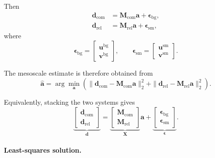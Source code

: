 \documentclass{article}
\begin{document}
Then
\begin{align}
\mathbf{d}_{\mathrm{com}}
&=
\mathbf{M}_{\mathrm{com}}\mathbf{a}
+
\boldsymbol{\epsilon}_{\mathrm{bg}},
\label{eq:com_ls_system}
\\
\mathbf{d}_{\mathrm{rel}}
&=
\mathbf{M}_{\mathrm{rel}}\mathbf{a}
+
\boldsymbol{\epsilon}_{\mathrm{sm}},
\label{eq:rel_ls_system}
\end{align}
where
\begin{equation}
\boldsymbol{\epsilon}_{\mathrm{bg}}
=
\begin{bmatrix}
\mathbf{u}^{\mathrm{bg}}\\
\mathbf{v}^{\mathrm{bg}}
\end{bmatrix},
\qquad
\boldsymbol{\epsilon}_{\mathrm{sm}}
=
\begin{bmatrix}
\mathbf{u}^{\mathrm{sm}}\\
\mathbf{v}^{\mathrm{sm}}
\end{bmatrix}.
\end{equation}

The mesoscale estimate is therefore obtained from
\begin{equation}
\hat{\mathbf a}
=
\arg\min_{\mathbf a}
\left(
\|
\mathbf{d}_{\mathrm{com}}-\mathbf{M}_{\mathrm{com}}\mathbf a
\|_2^2
+
\|
\mathbf{d}_{\mathrm{rel}}-\mathbf{M}_{\mathrm{rel}}\mathbf a
\|_2^2
\right).
\label{eq:joint_estimator}
\end{equation}

Equivalently, stacking the two systems gives
\begin{equation}
\underbrace{
\begin{bmatrix}
\mathbf{d}_{\mathrm{com}}\\
\mathbf{d}_{\mathrm{rel}}
\end{bmatrix}}_{\mathbf d}
=
\underbrace{
\begin{bmatrix}
\mathbf{M}_{\mathrm{com}}\\
\mathbf{M}_{\mathrm{rel}}
\end{bmatrix}}_{\mathbf X}
\mathbf a
+
\underbrace{
\begin{bmatrix}
\boldsymbol{\epsilon}_{\mathrm{bg}}\\
\boldsymbol{\epsilon}_{\mathrm{sm}}
\end{bmatrix}}_{\boldsymbol{\epsilon}}.
\label{eq:joint_stacked_system}
\end{equation}

\paragraph{Least-squares solution.}
\end{document}
